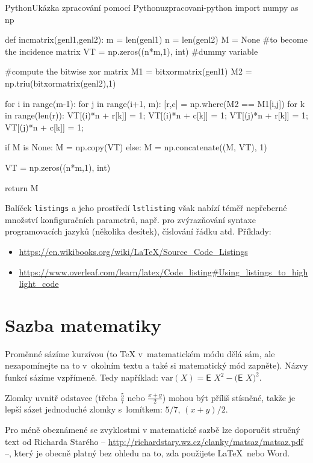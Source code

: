 \begin{code}{Python}{Ukázka zpracování pomocí Pythonu}{zpracovani-python}
import numpy as np
    
def incmatrix(genl1,genl2):
    m = len(genl1)
    n = len(genl2)
    M = None #to become the incidence matrix
    VT = np.zeros((n*m,1), int)  #dummy variable
    
    #compute the bitwise xor matrix
    M1 = bitxormatrix(genl1)
    M2 = np.triu(bitxormatrix(genl2),1) 

    for i in range(m-1):
        for j in range(i+1, m):
            [r,c] = np.where(M2 == M1[i,j])
            for k in range(len(r)):
                VT[(i)*n + r[k]] = 1;
                VT[(i)*n + c[k]] = 1;
                VT[(j)*n + r[k]] = 1;
                VT[(j)*n + c[k]] = 1;
                
                if M is None:
                    M = np.copy(VT)
                else:
                    M = np.concatenate((M, VT), 1)
                
                VT = np.zeros((n*m,1), int)
    
    return M
\end{code}

Balíček \texttt{listings} a jeho prostředí \texttt{lstlisting} však nabízí téměř nepřeberné množství konfiguračních parametrů, např. pro zvýrazňování syntaxe programovacích jazyků (několika desítek), číslování řádku atd. Příklady:
\begin{itemize}
\item \url{https://en.wikibooks.org/wiki/LaTeX/Source_Code_Listings}
\item \url{https://www.overleaf.com/learn/latex/Code_listing#Using_listings_to_highlight_code}
\end{itemize}


\section{Sazba matematiky}
Proměnné sázíme kurzívou (to \TeX{} v~matematickém módu dělá sám, ale
nezapomínejte na to v~okolním textu a také si matematický mód zapněte).
Názvy funkcí sázíme vzpřímeně. Tedy například:
$\textrm{var} (X) = \textsf{E~} X^2 - \bigl(\textsf{E~} X \bigr)^2$.

Zlomky uvnitř odstavce (třeba $\frac{5}{7}$ nebo $\frac{x+y}{2}$) mohou
být příliš stísněné, takže je lepší sázet jednoduché zlomky s~lomítkem:
$5/7$, $(x+y)/2$.

Pro méně obeznámené se zvyklostmi v matematické sazbě lze doporučit stručný text od Richarda Starého -- \url{http://richardstary.wz.cz/clanky/matsaz/matsaz.pdf} --, který je obecně platný bez ohledu na to, zda použijete \LaTeX\ nebo Word.

